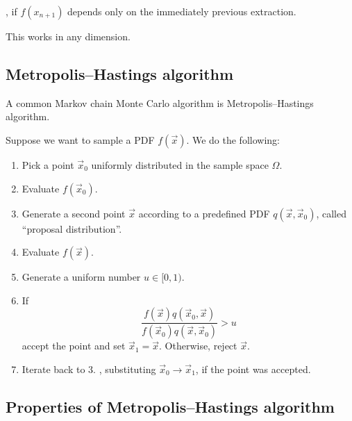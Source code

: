 \ie, if $f(x_{n + 1})$ depends only on the immediately previous extraction.

This works in any dimension.

\subsection{Metropolis–Hastings algorithm}
\label{subsec:metropolis}

A common Markov chain Monte Carlo algorithm is Metropolis–Hastings algorithm.

Suppose we want to sample a PDF $f(\vec{x})$. We do the following:

\begin{enumerate}
	\item Pick a point $\vec{x}_{0}$ uniformly distributed in the sample space $\Omega$.
	\item Evaluate $f(\vec{x}_{0})$.
	\item Generate a second point $\vec{x}$ according to a predefined PDF $q(\vec{x}, \vec{x}_{0})$, called “proposal distribution”.
	\item Evaluate $f(\vec{x})$.
	\item Generate a uniform number $u \in [0, 1)$.
	\item If
		$$
		\frac{f(\vec{x}) q(\vec{x}_{0}, \vec{x})}{f(\vec{x}_{0}) q(\vec{x}, \vec{x}_{0})} > u
		$$
		accept the point and set $\vec{x}_{1} = \vec{x}$. Otherwise, reject $\vec{x}$.
	\item Iterate back to 3. , substituting $\vec{x}_{0} \to \vec{x}_{1}$, if the point was accepted.
\end{enumerate}

\subsection{Properties of Metropolis–Hastings algorithm}
\label{subsec:prop_of_metropolis}

